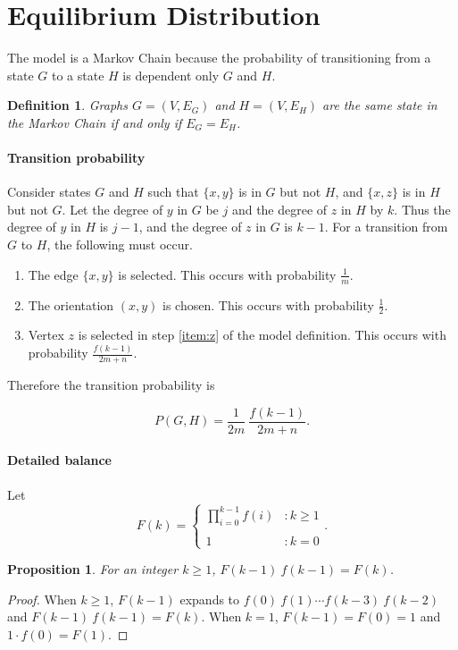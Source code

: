 \documentclass[a4paper,10pt]{article}
\newtheorem{defn}{Definition}
\newtheorem{prop}{Proposition}
\begin{document}
\section{Equilibrium Distribution}
The model is a Markov Chain because the probability of transitioning from a state $G$ to a state $H$ is dependent only $G$ and $H$. 

\begin{defn}
 Graphs $G = (V, E_G)$ and $H = (V, E_H)$ are the same state in the Markov Chain if and only if $E_G = E_H$.
\end{defn}


\paragraph{Transition probability} Consider states $G$ and $H$ such that $\{x, y\}$ is in $G$ but not $H$, and $\{x, z\}$ is in $H$ but not $G$. Let the degree of $y$ in $G$ be $j$ and the degree of $z$ in $H$ by $k$. Thus the degree of $y$ in $H$ is $j - 1$, and the degree of $z$ in $G$ is $k - 1$.
For a transition from $G$ to $H$, the following must occur.
\begin{enumerate}
 \item The edge $\{x, y\}$ is selected. This occurs with probability $\frac{1}{m}$.
 \item The orientation $(x, y)$ is chosen. This occurs with probability $\frac{1}{2}$.
 \item Vertex $z$ is selected in step \ref{item:z} of the model definition. This occurs with probability $\frac{f(k - 1)}{2m + n}$.
\end{enumerate}

\noindent Therefore the transition probability is 

\begin{equation}
\label{eqn:pgh}
 P(G, H) = \frac{1}{2m} \: \frac{f(k-1)}{2m+n}.
\end{equation}

\paragraph{Detailed balance}
Let 
\begin{equation}
 F(k) = \left\{
     \begin{array}{lr}
  \prod\limits_{i=0}^{k - 1} f(i) & : k \geq 1\\\\
  1 & : k = 0
     \end{array}
   \right..
\end{equation}
\begin{prop}\label{prop:F(k)}
 For an integer $k \geq 1$, $F(k - 1) \: f(k - 1) = F(k)$.
\end{prop}
\begin{proof}
When $k \geq 1$, $F(k - 1)$ expands to $f(0) \: f(1) \cdots f(k - 3) \: f(k - 2)$ and $F(k - 1) \: f(k - 1) = F(k)$. When $k = 1$, $F(k - 1) = F(0) = 1$ and $1 \cdot f(0) = F(1)$.
\end{proof}
\end{document}
